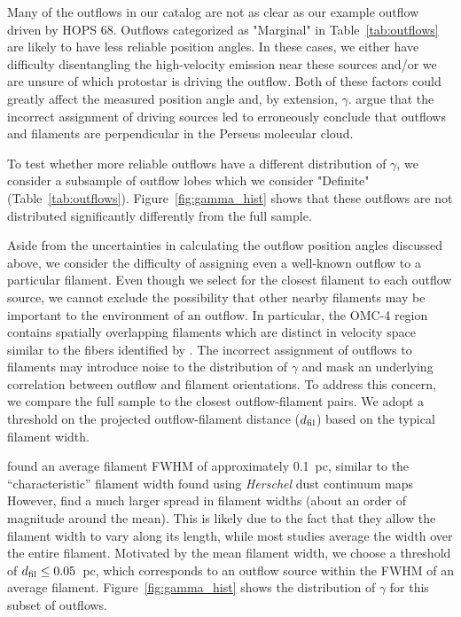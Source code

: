 \documentclass[twocolumn]{aastex63}
\newcommand{\example}{HOPS 68}
\begin{document}
Many of the outflows in our catalog are not as clear as our example outflow driven by \example{}. Outflows categorized as "Marginal" in Table~\ref{tab:outflows} are likely to have less reliable position angles. In these cases, we either have difficulty disentangling the high-velocity emission near these sources and/or we are unsure of which protostar is driving the outflow. Both of these factors could greatly affect the measured position angle and, by extension, $\gamma$. \citet{Stephens17} argue that the incorrect assignment of driving sources led \citet{Anathpindika08} to erroneously conclude that outflows and filaments are perpendicular in the Perseus molecular cloud.

To test whether more reliable outflows have a different distribution of $\gamma$, we consider a subsample of outflow lobes which we consider "Definite" (Table~\ref{tab:outflows}). Figure~\ref{fig:gamma_hist} shows that these outflows are not distributed significantly differently from the full sample.

Aside from the uncertainties in calculating the outflow position angles discussed above, we consider the difficulty of assigning even a well-known outflow to a particular filament. Even though we select for the closest filament to each outflow source, we cannot exclude the possibility that other nearby filaments may be important to the environment of an outflow. In particular, the OMC-4 region contains spatially overlapping filaments which are distinct in velocity space \citep{Suri19} similar to the fibers identified by \citet{Hacar13}. The incorrect assignment of outflows to filaments may introduce noise to the distribution of $\gamma$ and mask an underlying correlation between outflow and filament orientations. To address this concern, we compare the full sample to the closest outflow-filament pairs. We adopt a threshold on the projected outflow-filament distance ($d_{\rm fil}$) based on the typical filament width.

\citet{Suri19} found an average filament FWHM of approximately 0.1~pc, similar to the ``characteristic'' filament width found using \emph{Herschel} dust continuum maps \citep[e.g.][]{Arzoumanian11,Koch15} However, \citet{Suri19} find a much larger spread in filament widths (about an order of magnitude around the mean). This is likely due to the fact that they allow the filament width to vary along its length, while most studies average the width over the entire filament. Motivated by the mean filament width, we choose a threshold of $d_{\rm fil} \leq 0.05$~pc, which corresponds to an outflow source within the FWHM of an average filament. Figure~\ref{fig:gamma_hist} shows the distribution of $\gamma$ for this subset of outflows.
\end{document}
